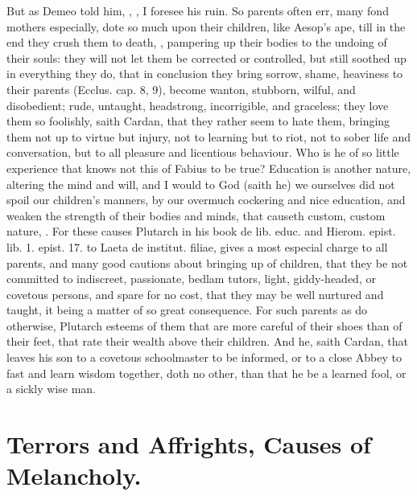 {But as Demeo told him, ,
, I foresee his ruin. So parents often err, many fond
mothers especially, dote so much upon their children, like
Aesop's ape, till in the end they crush them to death, , pampering up their bodies to the undoing of
their souls: they will not let them be corrected or controlled,
but still soothed up in everything they do, that in conclusion they
bring sorrow, shame, heaviness to their parents (Ecclus. cap.  8,
9), become wanton, stubborn, wilful, and disobedient; rude, untaught,
headstrong, incorrigible, and graceless; they love them so foolishly,
saith Cardan, that they rather seem to hate them, bringing them
not up to virtue but injury, not to learning but to riot, not to sober
life and conversation, but to all pleasure and licentious behaviour.
Who is he of so little experience that knows not this of Fabius to be
true? Education is another nature, altering the mind and will,
and I would to God (saith he) we ourselves did not spoil our children's
manners, by our overmuch cockering and nice education, and weaken the
strength of their bodies and minds, that causeth custom, custom nature,
\etc{}. For these causes Plutarch in his book de lib. educ. and Hierom.
epist. lib. 1. epist. 17. to Laeta de institut. filiae, gives a most
especial charge to all parents, and many good cautions about bringing
up of children, that they be not committed to indiscreet, passionate,
bedlam tutors, light, giddy-headed, or covetous persons, and spare for
no cost, that they may be well nurtured and taught, it being a matter
of so great consequence. For such parents as do otherwise, Plutarch
esteems of them that are more careful of their shoes than of
their feet, that rate their wealth above their children. And he, saith
Cardan, that leaves his son to a covetous schoolmaster to be
informed, or to a close Abbey to fast and learn wisdom together, doth
no other, than that he be a learned fool, or a sickly wise man.

\section{Terrors and Affrights, Causes of Melancholy.}\label{sec:terrors-and-affrights}

}

